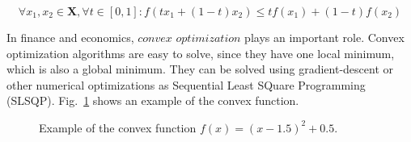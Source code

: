 \documentclass[12pt]{article}
\begin{document}
\begin{itemize}
\[\forall x_1,x_2 \in \mathbf{X}, \forall t \in [0,1]: f(tx_1+(1-t)x_2) \leq tf(x_1)+(1-t)f(x_2 )\]

In finance and economics, $convex$ $optimization$ plays an important role. Convex optimization algorithms are easy to solve, since they have one local minimum, which is also a global minimum. They can be solved using gradient-descent or other numerical optimizations as Sequential Least SQuare Programming (SLSQP). Fig.~\ref{fig:convex} shows an example of the convex function.

\begin{figure}[!htbp]
\begin{center}
\caption{Example of the convex function $f(x)=(x-1.5)^2+0.5$.}
\label{fig:convex}
\end{center}
\end{figure}


\end{itemize}
\end{document}

